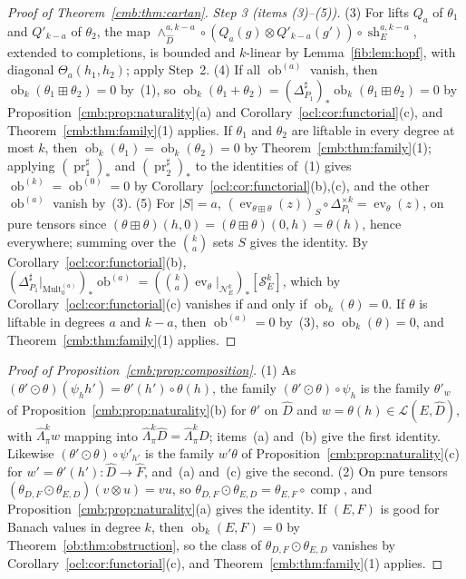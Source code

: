 \documentclass[11pt]{amsart}
\theoremstyle{definition}
\theoremstyle{remark}
\numberwithin{equation}{section}
\newcommand{\cL}{\mathcal L}
\newcommand{\Mult}{\operatorname{Mult}}
\newcommand{\abs}[1]{\lvert #1\rvert}
\theoremstyle{plain}
\theoremstyle{definition}
\theoremstyle{plain}
\newcommand{\ev}{\operatorname{ev}}
\newcommand{\ob}{\operatorname{ob}}
\newcommand{\cN}{\mathcal N}
\newcommand{\cS}{\mathcal S}
\begin{document}
\begin{proof}[Proof of Theorem~\ref{cmb:thm:cartan}]
\emph{Step 3 (items (3)--(5)).} (3) For lifts $Q_a$ of $\theta_1$ and $Q'_{k-a}$ of $\theta_2$, the map
$\wedge^{a,k-a}_{\widehat D}\circ(Q_a(g)\otimes Q'_{k-a}(g'))\circ\operatorname{sh}^{a,k-a}_E$, extended to completions,
is bounded and $k$-linear by Lemma~\ref{fib:lem:hopf}, with diagonal $\Theta_a(h_1,h_2)$; apply Step~2. (4) If all
$\ob^{(a)}$ vanish, then $\ob_k(\theta_1\boxplus\theta_2)=0$ by~(1), so
$\ob_k(\theta_1+\theta_2)=(\Delta_{P_1}^\sharp)_*\ob_k(\theta_1\boxplus\theta_2)=0$ by
Proposition~\ref{cmb:prop:naturality}(a) and Corollary~\ref{ocl:cor:functorial}(c), and Theorem~\ref{cmb:thm:family}(1)
applies. If $\theta_1$ and $\theta_2$ are liftable in every degree at most $k$, then
$\ob_k(\theta_1)=\ob_k(\theta_2)=0$ by Theorem~\ref{cmb:thm:family}(1); applying $(\operatorname{pr}_1^\sharp)_*$
and $(\operatorname{pr}_2^\sharp)_*$ to the identities of~(1) gives $\ob^{(k)}=\ob^{(0)}=0$ by
Corollary~\ref{ocl:cor:functorial}(b),(c), and the other $\ob^{(a)}$ vanish by~(3). (5) For $\abs S=a$,
$(\ev_{\theta\boxplus\theta}(z))_S\circ\Delta_{P_1}^{\times k}=\ev_\theta(z)$, on pure tensors since
$(\theta\boxplus\theta)(h,0)=(\theta\boxplus\theta)(0,h)=\theta(h)$, hence everywhere; summing over the $\binom ka$ sets
$S$ gives the identity. By Corollary~\ref{ocl:cor:functorial}(b),
$(\Delta_{P_1}^\sharp|_{\Mult^{(a)}_0})_*\ob^{(a)}=(\binom ka\ev_\theta|_{\cN^k_E})_*[\cS^k_E]$, which by
Corollary~\ref{ocl:cor:functorial}(c) vanishes if and only if $\ob_k(\theta)=0$. If $\theta$ is liftable in degrees $a$
and $k-a$, then $\ob^{(a)}=0$ by~(3), so $\ob_k(\theta)=0$, and Theorem~\ref{cmb:thm:family}(1) applies.
\end{proof}

\begin{proof}[Proof of Proposition~\ref{cmb:prop:composition}]
(1) As $(\theta'\odot\theta)(\psi_hh')=\theta'(h')\circ\theta(h)$, the family $(\theta'\odot\theta)\circ\psi_h$ is the
family $\theta'_w$ of Proposition~\ref{cmb:prop:naturality}(b) for $\theta'$ on $\widehat D$ and
$w=\theta(h)\in\cL(E,\widehat D)$, with $\widehat\Lambda^k_\pi w$ mapping into $\widehat\Lambda^k_\pi\widehat
D=\widehat\Lambda^k_\pi D$; items~(a) and~(b) give the first identity. Likewise $(\theta'\odot\theta)\circ\psi'_{h'}$ is
the family $w'\theta$ of Proposition~\ref{cmb:prop:naturality}(c) for $w'=\theta'(h')\colon\widehat D\to\widehat F$,
and~(a) and~(c) give the second. (2) On pure tensors $(\theta_{D,F}\odot\theta_{E,D})(v\otimes u)=vu$, so
$\theta_{D,F}\odot\theta_{E,D}=\theta_{E,F}\circ\operatorname{comp}$, and Proposition~\ref{cmb:prop:naturality}(a)
gives the identity. If $(E,F)$ is good for Banach values in degree $k$, then $\ob_k(E,F)=0$ by
Theorem~\ref{ob:thm:obstruction}, so the class of $\theta_{D,F}\odot\theta_{E,D}$ vanishes by
Corollary~\ref{ocl:cor:functorial}(c), and Theorem~\ref{cmb:thm:family}(1) applies.
\end{proof}
\end{document}
